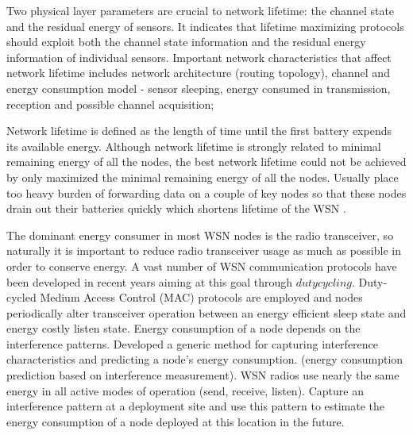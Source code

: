 Two physical layer parameters are crucial to network lifetime: the channel state and the residual energy of sensors. It indicates that lifetime maximizing protocols should exploit both the channel state information and the residual energy information of individual sensors. Important network characteristics that affect network lifetime includes network architecture (routing topology), channel and energy consumption model - sensor sleeping, energy consumed in transmission, reception and possible channel acquisition; 

Network lifetime is defined as the length of time until the first battery expends its available energy. Although network lifetime is strongly related to minimal remaining energy of all the nodes, the best network lifetime could not be achieved by only maximized the minimal remaining energy of all the nodes. Usually place too heavy burden of forwarding data on a couple of key nodes so that these nodes drain out their batteries quickly which shortens lifetime of the WSN \cite{erapl}.


The dominant energy consumer in most WSN nodes is the radio transceiver, so naturally it is important to reduce radio transceiver usage as much as possible in order to conserve energy. A vast number of WSN communication protocols have been developed in recent years aiming at this goal through $duty cycling$. Duty-cycled Medium Access Control (MAC) protocols are employed and nodes periodically alter transceiver operation between an energy efficient sleep state and energy costly listen state. Energy consumption of a node depends on the interference patterns. Developed a generic method for capturing interference characteristics and predicting a node's energy consumption. (energy consumption prediction based on interference measurement). WSN radios use nearly the same energy in all active modes of operation (send, receive, listen). Capture an interference pattern at a deployment site and use this pattern to estimate the energy consumption of a node deployed at this location in the future. \cite{alexlifetime}

